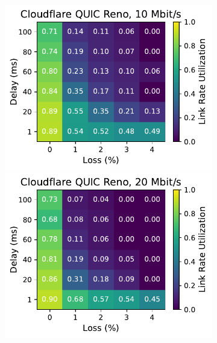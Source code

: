 \begin{figure}[ht]
\begin{subfigure}[b]{0.22\linewidth}
        \includegraphics[width=\linewidth,trim={0 0 2cm 0},clip]{splitting/figures/heatmaps/heatmap_quiche_reno_10mbps.pdf}
        \includegraphics[width=\linewidth,trim={0 0 2cm 0},clip]{splitting/figures/heatmaps/heatmap_quiche_reno_20mbps.pdf}

\end{subfigure}
\end{figure}
